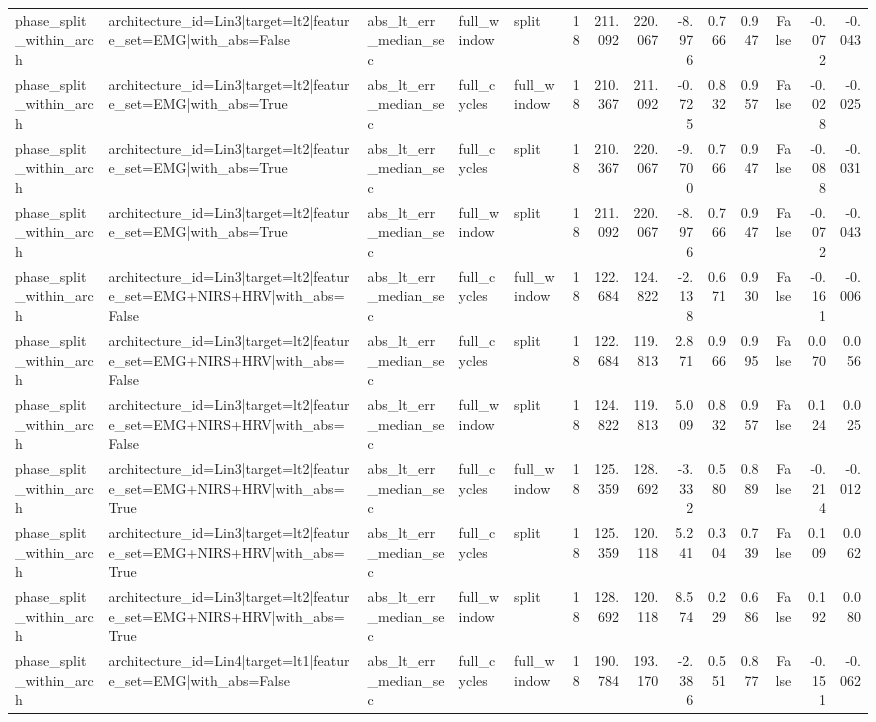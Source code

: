 \begin{table}
\begin{tabular}{lllllrrrrrrrrr}
phase_split_within_arch & architecture_id=Lin3|target=lt2|feature_set=EMG|with_abs=False & abs_lt_err_median_sec & full_window & split & 18 & 211.092 & 220.067 & -8.976 & 0.766 & 0.947 & False & -0.072 & -0.043 \\
phase_split_within_arch & architecture_id=Lin3|target=lt2|feature_set=EMG|with_abs=True & abs_lt_err_median_sec & full_cycles & full_window & 18 & 210.367 & 211.092 & -0.725 & 0.832 & 0.957 & False & -0.028 & -0.025 \\
phase_split_within_arch & architecture_id=Lin3|target=lt2|feature_set=EMG|with_abs=True & abs_lt_err_median_sec & full_cycles & split & 18 & 210.367 & 220.067 & -9.700 & 0.766 & 0.947 & False & -0.088 & -0.031 \\
phase_split_within_arch & architecture_id=Lin3|target=lt2|feature_set=EMG|with_abs=True & abs_lt_err_median_sec & full_window & split & 18 & 211.092 & 220.067 & -8.976 & 0.766 & 0.947 & False & -0.072 & -0.043 \\
phase_split_within_arch & architecture_id=Lin3|target=lt2|feature_set=EMG+NIRS+HRV|with_abs=False & abs_lt_err_median_sec & full_cycles & full_window & 18 & 122.684 & 124.822 & -2.138 & 0.671 & 0.930 & False & -0.161 & -0.006 \\
phase_split_within_arch & architecture_id=Lin3|target=lt2|feature_set=EMG+NIRS+HRV|with_abs=False & abs_lt_err_median_sec & full_cycles & split & 18 & 122.684 & 119.813 & 2.871 & 0.966 & 0.995 & False & 0.070 & 0.056 \\
phase_split_within_arch & architecture_id=Lin3|target=lt2|feature_set=EMG+NIRS+HRV|with_abs=False & abs_lt_err_median_sec & full_window & split & 18 & 124.822 & 119.813 & 5.009 & 0.832 & 0.957 & False & 0.124 & 0.025 \\
phase_split_within_arch & architecture_id=Lin3|target=lt2|feature_set=EMG+NIRS+HRV|with_abs=True & abs_lt_err_median_sec & full_cycles & full_window & 18 & 125.359 & 128.692 & -3.332 & 0.580 & 0.889 & False & -0.214 & -0.012 \\
phase_split_within_arch & architecture_id=Lin3|target=lt2|feature_set=EMG+NIRS+HRV|with_abs=True & abs_lt_err_median_sec & full_cycles & split & 18 & 125.359 & 120.118 & 5.241 & 0.304 & 0.739 & False & 0.109 & 0.062 \\
phase_split_within_arch & architecture_id=Lin3|target=lt2|feature_set=EMG+NIRS+HRV|with_abs=True & abs_lt_err_median_sec & full_window & split & 18 & 128.692 & 120.118 & 8.574 & 0.229 & 0.686 & False & 0.192 & 0.080 \\
phase_split_within_arch & architecture_id=Lin4|target=lt1|feature_set=EMG|with_abs=False & abs_lt_err_median_sec & full_cycles & full_window & 18 & 190.784 & 193.170 & -2.386 & 0.551 & 0.877 & False & -0.151 & -0.062 \\

\end{tabular}
\end{table}
